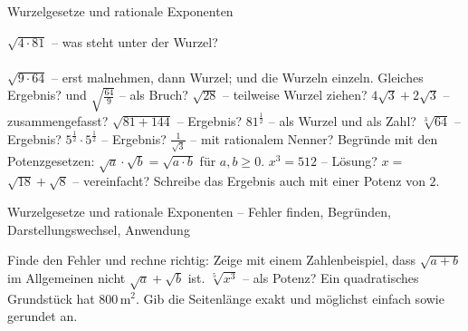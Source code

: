 \setcounter{aufgabe}{16}

\begin{aufgabe}{Wurzelgesetze und rationale Exponenten}
\begin{teile}
\teil $\sqrt{4 \cdot 81}$ – was steht unter der Wurzel? \\  \\ 
\teil $\sqrt{9 \cdot 64}$ – erst malnehmen, dann Wurzel; und die Wurzeln einzeln. Gleiches Ergebnis? \leerfeld und \leerfeld
\teil $\sqrt{\frac{64}{9}}$ – als Bruch? \leerfeld
\teil $\sqrt{28}$ – teilweise Wurzel ziehen? \leerfeld
\teil $4\sqrt{3} + 2\sqrt{3}$ – zusammengefasst? \leerfeld
\teil $\sqrt{81 + 144}$ – Ergebnis? \leerfeld
\teil $81^{\frac{1}{2}}$ – als Wurzel und als Zahl? \leerfeld
\teil $\sqrt[3]{64}$ – Ergebnis? \leerfeld
\teil $5^{\frac{1}{2}} \cdot 5^{\frac{1}{2}}$ – Ergebnis? \leerfeld
\teil $\frac{1}{\sqrt{3}}$ – mit rationalem Nenner? \leerfeld
\teil Begründe mit den Potenzgesetzen: $\sqrt{a} \cdot \sqrt{b} = \sqrt{a \cdot b}$ für $a, b \ge 0$.
\teil $x^3 = 512$ – Lösung? $x =$ \leerfeld
\teil $\sqrt{18} + \sqrt{8}$ – vereinfacht? Schreibe das Ergebnis auch mit einer Potenz von $2$.
\end{teile}
\end{aufgabe}

\begin{aufgabe}{Wurzelgesetze und rationale Exponenten – Fehler finden, Begründen, Darstellungswechsel, Anwendung}
\begin{teile}
\teil Finde den Fehler und rechne richtig: 
\teil Zeige mit einem Zahlenbeispiel, dass $\sqrt{a + b}$ im Allgemeinen nicht $\sqrt{a} + \sqrt{b}$ ist.
\teil $\sqrt[5]{x^3}$ – als Potenz? \leerfeld
\teil Ein quadratisches Grundstück hat $800\,\text{m}^2$. Gib die Seitenlänge exakt und möglichst einfach sowie gerundet an.
\end{teile}
\end{aufgabe}
